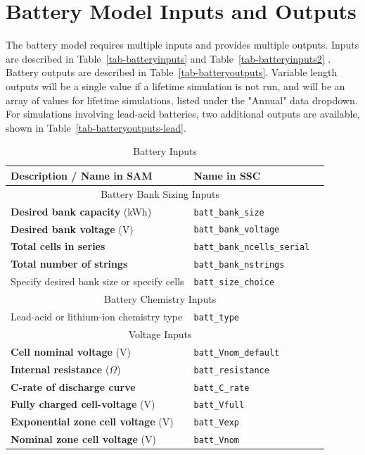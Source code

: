 \documentclass[12pt,letterpaper]{article}
\begin{document}
\section{Battery Model Inputs and Outputs}\label{sec-batterymodel-inputs}
The battery model requires multiple inputs and provides multiple outputs.  Inputs are described in Table~\ref{tab-batteryinputs} and Table~\ref{tab-batteryinputs2} .  Battery outputs are described in Table~\ref{tab-batteryoutputs}.  Variable length outputs will be a single value if a lifetime simulation is not run, and will be an array of values for lifetime simulations, listed under the "Annual" data dropdown.  For simulations involving lead-acid batteries, two additional outputs are available, shown in Table~\ref{tab-batteryoutputs-lead}.  

\begin{table}
\begin{center}
\caption{Battery Inputs}
\begin{tabular}{lll}
\midrule
Description / \textbf{Name in SAM} & Name in SSC \\
\midrule
\multicolumn{2}{c}{Battery Bank Sizing Inputs}\\
\textbf{Desired bank capacity} (kWh) & \texttt{batt\_bank\_size} \\
\textbf{Desired bank voltage} (V) & \texttt{batt\_bank\_voltage} \\
\textbf{Total cells in series} & \texttt{batt\_bank\_ncells\_serial} \\
\textbf{Total number of strings} & \texttt{batt\_bank\_nstrings} \\
Specify desired bank size or specify cells & \texttt{batt\_size\_choice} \\
\midrule
\multicolumn{2}{c}{Battery Chemistry Inputs}\\
Lead-acid or lithium-ion chemistry type & \texttt{batt\_type} \\
\midrule
\multicolumn{2}{c}{Voltage Inputs}\\
\textbf{Cell nominal voltage} (V) & \texttt{batt\_Vnom\_default} \\
\textbf{Internal resistance} ($\Omega$) & \texttt{batt\_resistance} \\
\textbf{C-rate of discharge curve} & \texttt{batt\_C\_rate} \\
\textbf{Fully charged cell-voltage} (V) & \texttt{batt\_Vfull} \\
\textbf{Exponential zone cell voltage} (V) & \texttt{batt\_Vexp} \\
\textbf{Nominal zone cell voltage} (V) & \texttt{batt\_Vnom} \\

\end{tabular}
\end{center}
\end{table}
\end{document}
